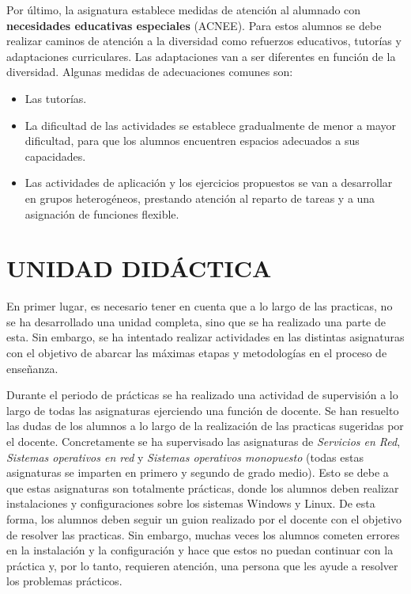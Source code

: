 \documentclass[spanish,12pt, a4paper,twoside]{paper}
\let\oldsection\section
\def\section{\cleardoublepage\oldsection}
\begin{document}
Por último, la asignatura establece medidas de atención al alumnado con \textbf{necesidades educativas especiales} (ACNEE). Para estos alumnos se debe realizar caminos de atención a la diversidad como refuerzos educativos, tutorías y adaptaciones curriculares. Las adaptaciones van a ser diferentes en función de la diversidad. Algunas medidas de adecuaciones comunes son:
\begin{itemize}
\item Las tutorías.
\item La dificultad de las actividades se establece gradualmente de menor a mayor dificultad, para que los alumnos encuentren espacios adecuados a sus capacidades.
\item Las actividades de aplicación y los ejercicios propuestos se van a desarrollar en grupos heterogéneos, prestando atención al reparto de tareas y a una asignación de funciones flexible.
\end{itemize}

\section{UNIDAD DIDÁCTICA} %

En primer lugar, es necesario tener en cuenta que a lo largo de las practicas, no se ha desarrollado una unidad completa, sino que se ha realizado una parte de esta. Sin embargo, se ha intentado realizar actividades en las distintas asignaturas con el objetivo de abarcar las máximas etapas y metodologías en el proceso de enseñanza.

Durante el periodo de prácticas se ha realizado una actividad de supervisión a lo largo de todas las asignaturas ejerciendo una función de docente. Se han resuelto las dudas de los alumnos a lo largo de la realización de las practicas sugeridas por el docente. Concretamente se ha supervisado las asignaturas de \textit{Servicios en Red}, \textit{Sistemas operativos en red} y \textit{Sistemas operativos monopuesto} (todas estas asignaturas se imparten en primero y segundo de grado medio). Esto se debe a que estas asignaturas son totalmente prácticas, donde los alumnos deben realizar instalaciones y configuraciones sobre los sistemas Windows y Linux. De esta forma, los alumnos deben seguir un guion realizado por el docente con el objetivo de resolver las practicas. Sin embargo, muchas veces los alumnos cometen errores en la instalación y la configuración y hace que estos no puedan continuar con la práctica y, por lo tanto, requieren atención, una persona que les ayude a resolver los problemas prácticos.
\end{document}

